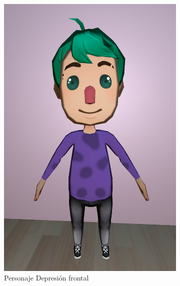 \documentclass[12pt, a4paper,twoside,titlepage]{book}
\begin{document}
 \begin{figure}
\centering
\begin{subfigure}{.5\textwidth}
  \centering
  \includegraphics[width=.95\linewidth]{TGF/Artes/DEP_front.png}
  \caption{Personaje Depresión frontal}
\end{subfigure}%
\begin{subfigure}{.5\textwidth}
  \centering

\end{subfigure}
\end{figure}
\end{document}
